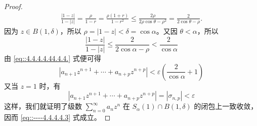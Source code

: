 \documentclass[../../main.tex]{subfiles}%
\begin{document}
\begin{proof}
\[\begin{aligned}
\frac{|1 - z|}{1 - |z|} = \frac{\rho}{1 - r} = \frac{\rho (1 + r)}{1 - r^2} \leqslant  \frac{2\rho}{2\rho \cos\theta - \rho^2} = \frac{2}{2\cos\theta - \rho}.
\end{aligned}
\]
因为 \( z \in B(1, \delta) \)，所以 \( \rho = |1 - z| < \delta = \cos\alpha \)。又因 \( \theta < \alpha \)，所以
\[
\frac{|1 - z|}{1 - |z|} \leqslant  \frac{2}{2\cos\alpha - \rho} < \frac{2}{\cos\alpha}
\]
由 \eqref{eq::4.4.4.4.44.4.4.} 式便可得
\[
|a_{n+1} z^{n+1} + \cdots + a_{n+p} z^{n+p}| < \varepsilon \left( \frac{2}{\cos\alpha} + 1 \right)
\]
又当 \( z = 1 \) 时，有
\[
|a_{n+1} z^{n+1} + \cdots + a_{n+p} z^{n+p}| = |\sigma_{n,p}| < \varepsilon
\]
这样，我们就证明了级数 \( \sum_{n=0}^{\infty} a_n z^n \) 在 \( S_{\alpha}(1) \cap B(1, \delta) \) 的闭包上一致收敛，因而 \eqref{eq::----4.4.4.4.3} 式成立。

\end{proof}
\end{document}
